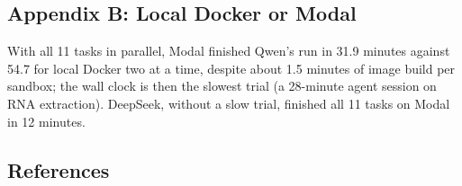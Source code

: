 \documentclass[
]{article}
\begin{document}
\subsection{Appendix B: Local Docker or
Modal}\label{appendix-b-local-docker-or-modal}

With all 11 tasks in parallel, Modal finished Qwen's run in 31.9 minutes
against 54.7 for local Docker two at a time, despite about 1.5 minutes
of image build per sandbox; the wall clock is then the slowest trial (a
28-minute agent session on RNA extraction). DeepSeek, without a slow
trial, finished all 11 tasks on Modal in 12 minutes.

\subsection{References}\label{references}


\end{document}
